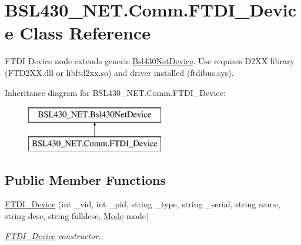 \hypertarget{class_b_s_l430___n_e_t_1_1_comm_1_1_f_t_d_i___device}{}\section{B\+S\+L430\+\_\+\+N\+E\+T.\+Comm.\+F\+T\+D\+I\+\_\+\+Device Class Reference}
\label{class_b_s_l430___n_e_t_1_1_comm_1_1_f_t_d_i___device}


F\+T\+DI Device node extends generic \mbox{\hyperlink{class_b_s_l430___n_e_t_1_1_bsl430_net_device}{Bsl430\+Net\+Device}}. Use requires D2\+XX library (F\+T\+D2\+X\+X.\+dll or libftd2xx.\+so) and driver installed (ftdibus.\+sys).  


Inheritance diagram for B\+S\+L430\+\_\+\+N\+E\+T.\+Comm.\+F\+T\+D\+I\+\_\+\+Device\+:\begin{figure}[H]
\begin{center}
\leavevmode
\includegraphics[height=2.000000cm]{class_b_s_l430___n_e_t_1_1_comm_1_1_f_t_d_i___device}
\end{center}
\end{figure}
\subsection*{Public Member Functions}
\begin{DoxyCompactItemize}
\item 
\mbox{\hyperlink{class_b_s_l430___n_e_t_1_1_comm_1_1_f_t_d_i___device_a747dd9c01a41ba754c6a9839a7389f90}{F\+T\+D\+I\+\_\+\+Device}} (int \+\_\+vid, int \+\_\+pid, string \+\_\+type, string \+\_\+serial, string name, string desc, string fulldesc, \mbox{\hyperlink{namespace_b_s_l430___n_e_t_aa1c6981cb6f279b5491d861ca555a1d7}{Mode}} mode)
\begin{DoxyCompactList}\small\item\em \mbox{\hyperlink{class_b_s_l430___n_e_t_1_1_comm_1_1_f_t_d_i___device}{F\+T\+D\+I\+\_\+\+Device}} constructor. \end{DoxyCompactList}\end{DoxyCompactItemize}
